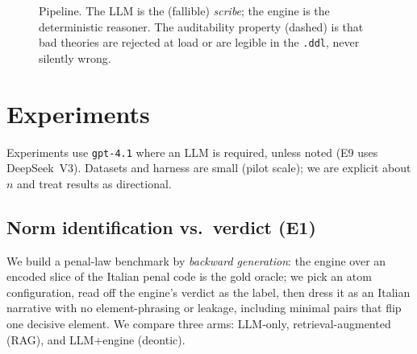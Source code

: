 \begin{figure}[h]\centering
{}
\caption{Pipeline. The LLM is the (fallible) \emph{scribe}; the engine is the
deterministic reasoner. The auditability property (dashed) is that bad theories are
rejected at load or are legible in the \texttt{.ddl}, never silently wrong.}
\label{fig:pipeline}
\end{figure}

\section{Experiments}
Experiments use \texttt{gpt-4.1} where an LLM is required, unless noted (E9 uses
DeepSeek~V3). Datasets and harness are small (pilot scale); we are explicit about
$n$ and treat results as directional.

\subsection{Norm identification vs.\ verdict (E1)}
We build a penal-law benchmark by \emph{backward generation}: the engine over an
encoded slice of the Italian penal code is the gold oracle; we pick an atom
configuration, read off the engine's verdict as the label, then dress it as an
Italian narrative with no element-phrasing or leakage, including minimal pairs that
flip one decisive element. We compare three arms: LLM-only, retrieval-augmented
(RAG), and LLM+engine (deontic).

